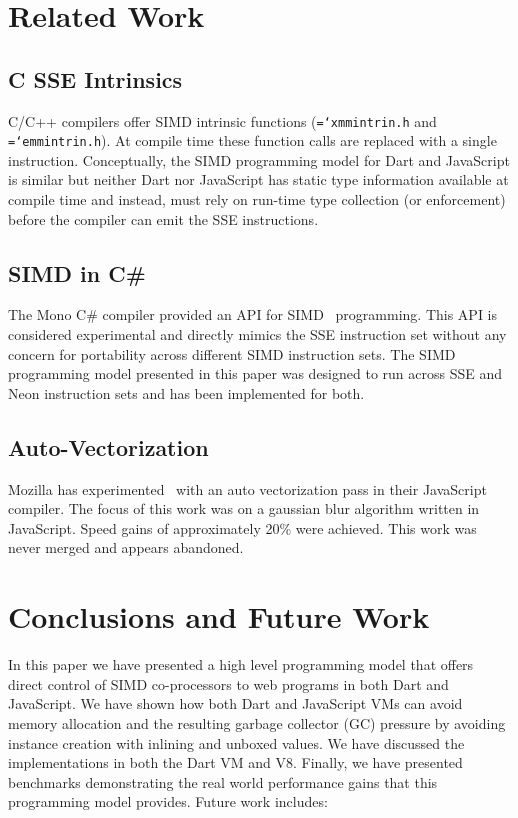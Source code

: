 \documentclass[preprint]{sigplanconf}
\newcommand{\ttt}[1]{{\texttt{\hyphenchar\font=`\-\relax #1}}}%
\begin{document}
\section{Related Work}

\subsection{C SSE Intrinsics}

C/C++ compilers offer SIMD intrinsic functions (\ttt{xmmintrin.h} and
\ttt{emmintrin.h}). At compile time these function calls are replaced with a
single instruction. Conceptually, the SIMD programming model for Dart and
JavaScript is similar but neither Dart nor JavaScript has static type
information available at compile time and instead, must rely on run-time type
collection (or enforcement) before the compiler can emit the SSE instructions.

\subsection{SIMD in C\#}

The Mono C\# compiler provided an API for SIMD~\cite{monosimd} programming. This
API is considered experimental and directly mimics the SSE instruction set
without any concern for portability across different SIMD instruction sets. The
SIMD programming model presented in this paper was designed to run across SSE
and Neon instruction sets and has been implemented for both.

\subsection{Auto-Vectorization}

Mozilla has experimented~\cite{mozillasimd} with an auto vectorization pass in
their JavaScript compiler. The focus of this work was on a gaussian blur
algorithm written in JavaScript. Speed gains of approximately 20\% were
achieved. This work was never merged and appears abandoned.

\section{Conclusions and Future Work}

In this paper we have presented a high level programming model that offers
direct control of SIMD co-processors to web programs in both Dart and
JavaScript. We have shown how both Dart and JavaScript VMs can avoid memory
allocation and the resulting garbage collector (GC) pressure by avoiding
instance creation with inlining and unboxed values. We have discussed the
implementations in both the Dart VM and V8. Finally, we have presented
benchmarks demonstrating the real world performance gains that this programming
model provides. Future work includes:
\end{document}
